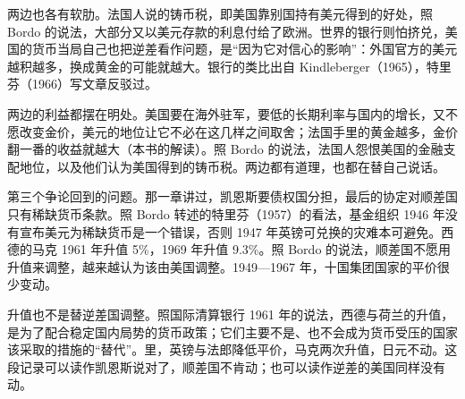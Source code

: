 两边也各有软肋。法国人说的铸币税，即美国靠别国持有美元得到的好处，照 Bordo 的说法，大部分又以美元存款的利息付给了欧洲\cite{bordo1993}。世界的银行则怕挤兑，美国的货币当局自己也把逆差看作问题，是“因为它对信心的影响”：外国官方的美元越积越多，换成黄金的可能就越大\cite{bordo1993}。银行的类比出自 Kindleberger（1965），特里芬（1966）写文章反驳过\cite{garber1993}。

两边的利益都摆在明处。美国要在海外驻军，要低的长期利率与国内的增长，又不愿改变金价\cite{bis36}，美元的地位让它不必在这几样之间取舍；法国手里的黄金越多，金价翻一番的收益就越大（本书的解读）。照 Bordo 的说法，法国人怨恨美国的金融支配地位，以及他们认为美国得到的铸币税\cite{bordo1993}。两边都有道理，也都在替自己说话。

第三个争论回到的问题。那一章讲过，凯恩斯要债权国分担，最后的协定对顺差国只有稀缺货币条款。照 Bordo 转述的特里芬（1957）的看法，基金组织 1946 年没有宣布美元为稀缺货币是一个错误，否则 1947 年英镑可兑换的灾难本可避免\cite{bordo1993}。西德的马克 1961 年升值 5\%，1969 年升值 9.3\%\cite{bis36}。照 Bordo 的说法，顺差国不愿用升值来调整，越来越认为该由美国调整\cite{bordo1993}。1949—1967 年，十国集团国家的平价很少变动\cite{bordo1993}。

升值也不是替逆差国调整。照国际清算银行 1961 年的说法，西德与荷兰的升值，是为了配合稳定国内局势的货币政策；它们主要不是、也不会成为货币受压的国家该采取的措施的“替代”\cite{bis36}。里，英镑与法郎降低平价，马克两次升值，日元不动。这段记录可以读作凯恩斯说对了，顺差国不肯动；也可以读作逆差的美国同样没有动。


